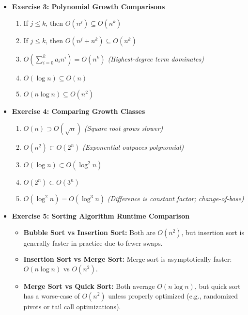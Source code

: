 \documentclass[11pt]{article}
\begin{document}
\begin{itemize}[leftmargin=*]
\vspace{1em}

\item \textbf{Exercise 3: Polynomial Growth Comparisons}

\begin{enumerate}
    \item If \( j \leq k \), then \( O(n^j) \subseteq O(n^k) \)

    \item If \( j \leq k \), then \( O(n^j + n^k) \subseteq O(n^k) \)

    \item \( O\left(\sum_{i=0}^{k} a_i n^i \right) = O(n^k) \)  
    \textit{(Highest-degree term dominates)}

    \item \( O(\log n) \subseteq O(n) \)

    \item \( O(n \log n) \subseteq O(n^2) \)
\end{enumerate}

\vspace{1em}

\item \textbf{Exercise 4: Comparing Growth Classes}

\begin{enumerate}
    \item \( O(n) \supset O(\sqrt{n}) \)  
    \textit{(Square root grows slower)}

    \item \( O(n^2) \subset O(2^n) \)  
    \textit{(Exponential outpaces polynomial)}

    \item \( O(\log n) \subset O(\log^2 n) \)

    \item \( O(2^n) \subset O(3^n) \)

    \item \( O(\log^2 n) = O(\log^3 n) \)  
    \textit{(Difference is constant factor; change-of-base)}
\end{enumerate}

\vspace{1em}

\item \textbf{Exercise 5: Sorting Algorithm Runtime Comparison}

\begin{itemize}
    \item \textbf{Bubble Sort vs Insertion Sort:}  
    Both are \( O(n^2) \), but insertion sort is generally faster in practice due to fewer swaps.

    \item \textbf{Insertion Sort vs Merge Sort:}  
    Merge sort is asymptotically faster: \( O(n \log n) \) vs \( O(n^2) \).

    \item \textbf{Merge Sort vs Quick Sort:}  
    Both average \( O(n \log n) \), but quick sort has a worse-case of \( O(n^2) \) unless properly optimized (e.g., randomized pivots or tail call optimizations).
\end{itemize}

\end{itemize}
\end{document}
